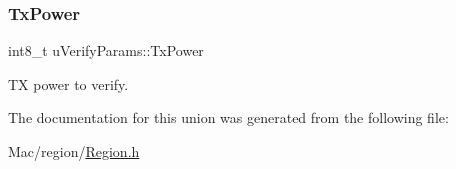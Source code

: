 \subsubsection{\texorpdfstring{Tx\+Power}{TxPower}}
{\footnotesize\ttfamily int8\+\_\+t u\+Verify\+Params\+::\+Tx\+Power}

TX power to verify. 

The documentation for this union was generated from the following file\+:\begin{DoxyCompactItemize}
\item 
Mac/region/\hyperlink{Region_8h}{Region.\+h}\end{DoxyCompactItemize}
